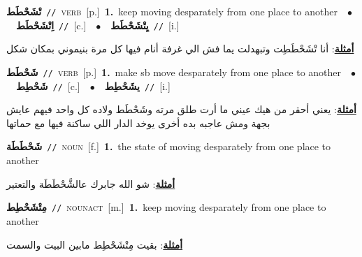 \documentclass[10pt,a4paper,twoside]{article} %
\begin{document}
\begin{multicols}{2}
{\setlength\topsep{0pt}\textbf{\foreignlanguage{arabic}{تْشَحْطَط}}\ {\color{gray}\texttt{//}\color{black}}\ \textsc{verb}\ [p.]\ \textbf{1.}~keep moving desparately from one place to another\ \ $\bullet$\ \ \setlength\topsep{0pt}\textbf{\foreignlanguage{arabic}{اِتْشَحْطَط}}\ {\color{gray}\texttt{//}\color{black}}\ [c.]\ \ $\bullet$\ \ \setlength\topsep{0pt}\textbf{\foreignlanguage{arabic}{يِتْشَحْطَط}}\ {\color{gray}\texttt{//}\color{black}}\ [i.]\  \begin{flushright}\color{gray}\foreignlanguage{arabic}{\textbf{\underline{\foreignlanguage{arabic}{أمثلة}}}: أنا   تْشَحْطَطِت وتبهدلت يما فش الي غرفة أنام فيها كل مرة بنيموني بمكان شكل}\end{flushright}\color{black}} \vspace{2mm}

{\setlength\topsep{0pt}\textbf{\foreignlanguage{arabic}{شَحْطَط}}\ {\color{gray}\texttt{//}\color{black}}\ \textsc{verb}\ [p.]\ \textbf{1.}~make sb move desparately from one place to another\ \ $\bullet$\ \ \setlength\topsep{0pt}\textbf{\foreignlanguage{arabic}{شَحْطِط}}\ {\color{gray}\texttt{//}\color{black}}\ [c.]\ \ $\bullet$\ \ \setlength\topsep{0pt}\textbf{\foreignlanguage{arabic}{يشَحْطِط}}\ {\color{gray}\texttt{//}\color{black}}\ [i.]\  \begin{flushright}\color{gray}\foreignlanguage{arabic}{\textbf{\underline{\foreignlanguage{arabic}{أمثلة}}}: يعني أحقر من هيك عيني ما أرت طلق مرته وشَحْطَط ولاده كل واحد فيهم عايش بجهة ومش عاجبه بده أخرى يوخد الدار اللي ساكنة فيها مع حماتها}\end{flushright}\color{black}} \vspace{2mm}

{\setlength\topsep{0pt}\textbf{\foreignlanguage{arabic}{شَحْطَطَة}}\ {\color{gray}\texttt{//}\color{black}}\ \textsc{noun}\ [f.]\ \textbf{1.}~the state of moving desparately from one place to another\  \begin{flushright}\color{gray}\foreignlanguage{arabic}{\textbf{\underline{\foreignlanguage{arabic}{أمثلة}}}: شو الله جابرك عالشَّحْطَطَة والتعتير}\end{flushright}\color{black}} \vspace{2mm}

{\setlength\topsep{0pt}\textbf{\foreignlanguage{arabic}{مِتْشَحْطِط}}\ {\color{gray}\texttt{//}\color{black}}\ \textsc{noun\textunderscore act}\ [m.]\ \textbf{1.}~keep moving desparately from one place to another\  \begin{flushright}\color{gray}\foreignlanguage{arabic}{\textbf{\underline{\foreignlanguage{arabic}{أمثلة}}}: بقيت مِتْشَحْطِط مابين البيت والسمت}\end{flushright}\color{black}} \vspace{2mm}


\end{multicols}
\end{document}
